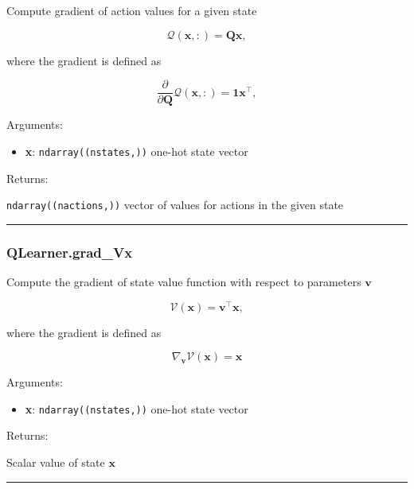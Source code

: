 Compute gradient of action values for a given state

\[
\mathcal Q(\mathbf x, :) = \mathbf Q \mathbf x,
\]

where the gradient is defined as

\[
\frac{\partial}{\partial \mathbf Q} \mathcal Q(\mathbf x, :) = \mathbf 1 \mathbf x^\top,
\]

Arguments:

\begin{itemize}
\tightlist
\item
  \textbf{x}: \texttt{ndarray((nstates,))} one-hot state vector
\end{itemize}

Returns:

\texttt{ndarray((nactions,))} vector of values for actions in the given
state

\begin{center}\rule{0.5\linewidth}{\linethickness}\end{center}

\subsubsection{QLearner.grad\_Vx}\label{qlearner.grad_vx}

\begin{Shaded}
\begin{Highlighting}[]
\end{Highlighting}
\end{Shaded}

Compute the gradient of state value function with respect to parameters
\(\mathbf v\)

\[
\mathcal V(\mathbf x) = \mathbf v^\top \mathbf x,
\]

where the gradient is defined as

\[
\nabla_{\mathbf v} \mathcal V(\mathbf x) = \mathbf x
\]

Arguments:

\begin{itemize}
\tightlist
\item
  \textbf{x}: \texttt{ndarray((nstates,))} one-hot state vector
\end{itemize}

Returns:

Scalar value of state \(\mathbf x\)

\begin{center}\rule{0.5\linewidth}{\linethickness}\end{center}

